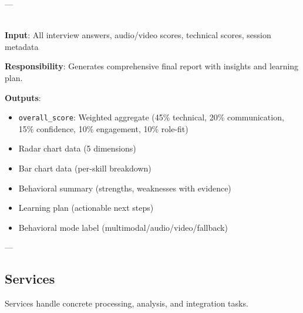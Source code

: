 \documentclass[11pt]{article}
\begin{document}
\begin{description}[leftmargin=3cm, style=nextline]
  ---

  \item[\textbf{feedback\_agent}]
  \hfill \\
  \textbf{Input}: All interview answers, audio/video scores, technical scores, session metadata

  \textbf{Responsibility}: Generates comprehensive final report with insights and learning plan.

  \textbf{Outputs}:
  \begin{itemize}
    \item \texttt{overall\_score}: Weighted aggregate (45\% technical, 20\% communication, 15\% confidence, 10\% engagement, 10\% role-fit)
    \item Radar chart data (5 dimensions)
    \item Bar chart data (per-skill breakdown)
    \item Behavioral summary (strengths, weaknesses with evidence)
    \item Learning plan (actionable next steps)
    \item Behavioral mode label (multimodal/audio/video/fallback)
  \end{itemize}

  ---

\end{description}

\newpage

\subsection{Services}

Services handle concrete processing, analysis, and integration tasks.
\end{document}
